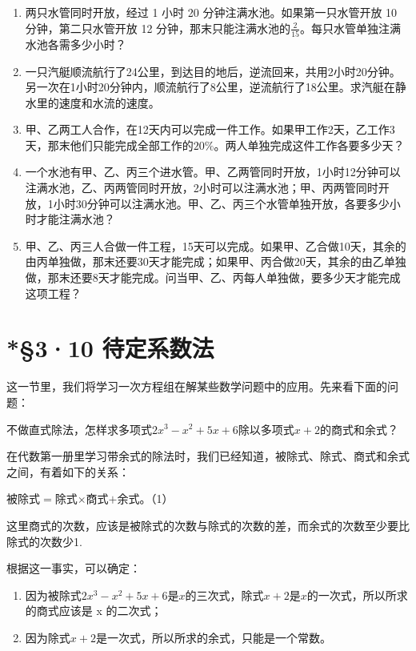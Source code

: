 \begin{enumerate}
\item
  两只水管同时开放，经过 1 小时 20 分钟注满水池。如果第一只水管开放 10
  分钟，第二只水管开放 12
  分钟，那末只能注满水池的\(\frac{2}{15}\)。每只水管单独注满水池各需多少小时？
\item
  一只汽艇顺流航行了24公里，到达目的地后，逆流回来，共用2小时20分钟。另一次在1小时20分钟内，顺流航行了8公里，逆流航行了18公里。求汽艇在静水里的速度和水流的速度。
\item
  甲、乙两工人合作，在12天内可以完成一件工作。如果甲工作2天，乙工作3天，那末他们只能完成全部工作的\(20\%\)。两人单独完成这件工作各要多少天？
\item
  一个水池有甲、乙、丙三个进水管。甲、乙两管同时开放，1小时12分钟可以注满水池，乙、丙两管同时开放，2小时可以注满水池；甲、丙两管同时开放，1小时30分钟可以注满水池。甲、乙、丙三个水管单独开放，各要多少小时才能注满水池？
\item
  甲、乙、丙三人合做一件工程，15天可以完成。如果甲、乙合做10天，其余的由丙单独做，那末还要30天才能完成；如果甲、丙合做20天，其余的由乙单独做，那末还要8天才能完成。问当甲、乙、丙每人单独做，要多少天才能完成这项工程？
\end{enumerate}

\section{*§3·10 待定系数法}

这一节里，我们将学习一次方程组在解某些数学问题中的应用。先来看下面的问题：

不做直式除法，怎样求多项式\(2x^{3} - x^{2} + 5x + 6\)除以多项式\(x + 2\)的商式和余式？

在代数第一册里学习带余式的除法时，我们已经知道，被除式、除式、商式和余式之间，有着如下的关系：

被除式\(=\)除式\(\times\)商式\(+\)余式。（1）

这里商式的次数，应该是被除式的次数与除式的次数的差，而余式的次数至少要比除式的次数少1.

根据这一事实，可以确定：

\begin{enumerate}
\item
  因为被除式\(2x^{3} - x^{2} + 5x + 6\)是\(x\)的三次式，除式\(x + 2\)是\(x\)的一次式，所以所求的商式应该是
  x 的二次式；
\item
  因为除式\(x + 2\)是一次式，所以所求的余式，只能是一个常数。
\end{enumerate}

